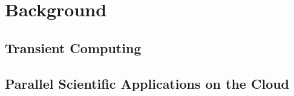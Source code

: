 
\section{Background}

\subsection{Transient Computing}

\subsection{Parallel Scientific Applications on the Cloud}



